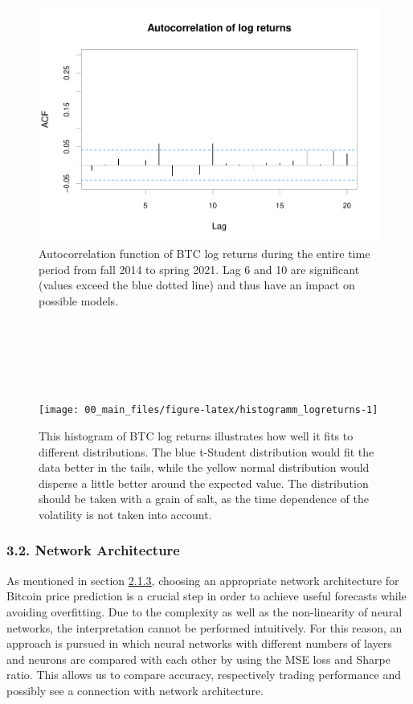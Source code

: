 \documentclass[
]{article}
\begin{document}
\newpage

\begin{figure}

{\centering \includegraphics[width=0.7\linewidth]{00_main_files/figure-latex/acf_log_ret-1} 

}

\caption{Autocorrelation function of BTC log returns during the entire time period from fall 2014 to spring 2021. Lag 6 and 10 are significant (values exceed the blue dotted line) and thus have an impact on possible models.}\label{fig:acf_log_ret}
\end{figure}

~

~

~

\begin{figure}

{\centering \texttt{[image: 00\_main\_files/figure-latex/histogramm\_logreturns-1]} 

}

\caption{This histogram of BTC log returns illustrates how well it fits to different distributions. The blue t-Student distribution would fit the data better in the tails, while the yellow normal distribution would disperse a little better around the expected value. The distribution should be taken with a grain of salt, as the time dependence of the volatility is not taken into account.}\label{fig:histogramm_logreturns}
\end{figure}

\newpage

\hypertarget{networkarchitecture}{%
\subsubsection{3.2. Network Architecture}\label{networkarchitecture}}

As mentioned in section \protect\hyperlink{MLP}{2.1.3}, choosing an
appropriate network architecture for Bitcoin price prediction is a
crucial step in order to achieve useful forecasts while avoiding
overfitting. Due to the complexity as well as the non-linearity of
neural networks, the interpretation cannot be performed intuitively. For
this reason, an approach is pursued in which neural networks with
different numbers of layers and neurons are compared with each other by
using the MSE loss and Sharpe ratio. This allows us to compare accuracy,
respectively trading performance and possibly see a connection with
network architecture.
\end{document}
